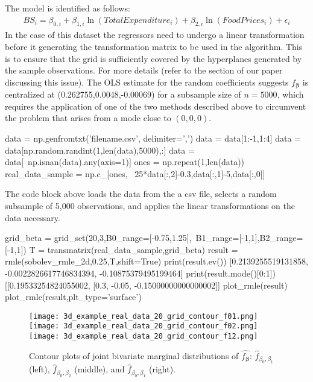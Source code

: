 \documentclass[a4paper,12pt]{article}
\newcommand{\bbeta}{{\boldsymbol{\beta}}}
\begin{document}
The model is identified as follows:
\begin{align*}
	BS_i = \beta_{0,i} + \beta_{1,i}\ln(TotalExpenditure_i) + \beta_{2,i}\ln(FoodPrices_i) + \epsilon_i
\end{align*}
In the case of this dataset the regressors need to undergo a linear transformation before it generating the transformation matrix to be used in the algorithm. This is to ensure that the grid is sufficiently covered by the hyperplanes generated by the sample observations. For more details (refer to the section of our paper discussing this issue).
The OLS estimate for the random coefficients suggests $f_\bbeta$ is centralized at (0.262755,0.0048,-0.00069) for a subsample size of $n = 5000$, which requires the application of one of the two methods described above to circumvent the problem that arises from a mode close to $(0,0,0)$.
\medskip
\begin{python}
data = np.genfromtxt('filename.csv', delimiter=',')
data = data[1:-1,1:4]
data = data[np.random.randint(1,len(data),5000),:]
data = data[~np.isnan(data).any(axis=1)]
ones = np.repeat(1,len(data))
real_data_sample = np.c_[ones, \ 
25*data[:,2]-0.3,data[:,1]-5,data[:,0]]
\end{python}

\medskip

The code block above loads the data from the a csv file, selects a random subsample of 5,000 observations, and applies the linear transformations on the data necessary. 

\medskip
\begin{python}
grid_beta  = grid_set(20,3,B0_range=[-0.75,1.25],\
B1_range=[-1,1],B2_range=[-1,1])
T = transmatrix(real_data_sample,grid_beta)
result = rmle(sobolev_rmle_2d,0.25,T,shift=True)
print(result.ev())
[0.2139255519131858, -0.0022826617746834394, -0.10875379495199464]
print(result.mode()[0:1])
[[0.19533254824055002, [0.3, -0.05, -0.15000000000000002]]
plot_rmle(result)
plot_rmle(result,plt_type='surface')
\end{python}

\begin{figure}[htp]
	
	\centering
	\texttt{[image: 3d\_example\_real\_data\_20\_grid\_contour\_f01.png]}\hfill
	\texttt{[image: 3d\_example\_real\_data\_20\_grid\_contour\_f02.png]}\hfill
	\texttt{[image: 3d\_example\_real\_data\_20\_grid\_contour\_f12.png]}
	
	\caption{Contour plots of joint bivariate marginal distributions of $\hat{f_\bbeta}$: $\hat{f}_{\beta_0,\beta_1}$ (left), $\hat{f}_{\beta_0,\beta_2}$ (middle), and $\hat{f}_{\beta_0,\beta_1}$ (right).}
	\label{fig:3d_20_real_grid_contour}
	
\end{figure}
\end{document}
